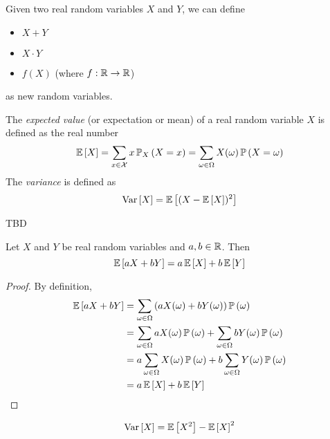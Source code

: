 Given two real random variables $X$ and $Y$, we can define
\begin{itemize}
    \item $X + Y$
    \item $X \cdot Y$
    \item $f(X)$ (where $f:\mathbb{R} \to \mathbb{R}$)
\end{itemize}
as new random variables.

\begin{definition}
    The \emph{expected value} (or expectation or mean) of a real random variable $X$
    is defined as the real number
    \[\expectation{X} = \sum_{x \in \mathcal{X}} x\prob[X]{X=x} = \sum_{\omega \in \Omega}X(\omega)\prob{X = \omega}\]
    The \emph{variance} is defined as
    \[\variance{X} = \expectation{(X - \expectation{X})^2}\]
\end{definition}

\begin{example}
    TBD
\end{example}

\begin{theorem}
    \label{thm:linearityofexpectation}
    Let $X$ and $Y$ be real random variables and $a, b \in \mathbb{R}$. Then
    \[\expectation{aX + bY} = a\expectation{X} + b\expectation{Y}\]
\end{theorem}

\begin{proof}
    By definition,
    \begin{align*}\expectation{aX + bY}
         & = \sum_{\omega \in \Omega}\left(aX(\omega) + bY(\omega)\right)\prob{\omega}                          \\
         & = \sum_{\omega \in \Omega}aX(\omega)\prob{\omega} + \sum_{\omega \in \Omega} bY(\omega)\prob{\omega} \\
         & = a\sum_{\omega \in \Omega}X(\omega)\prob{\omega} + b\sum_{\omega \in \Omega} Y(\omega)\prob{\omega} \\
         & = a\expectation{X} + b\expectation{Y}\qedhere
    \end{align*}
\end{proof}

\begin{corollary}
    \[\variance{X} = \expectation{X^2} - \expectation{X}^2\]
\end{corollary}

